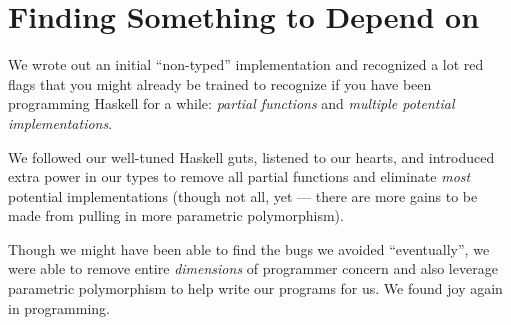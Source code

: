 \documentclass[]{article}
\newenvironment{Shaded}{}{}
\newcommand{\CommentTok}[1]{\textcolor[rgb]{0.38,0.63,0.69}{\textit{#1}}}
\newcommand{\ExtensionTok}[1]{#1}
\newcommand{\NormalTok}[1]{#1}
\begin{document}
\begin{Shaded}
\end{Shaded}

\hypertarget{finding-something-to-depend-on}{%
\section{Finding Something to Depend on}\label{finding-something-to-depend-on}}

We wrote out an initial ``non-typed'' implementation and recognized a lot red
flags that you might already be trained to recognize if you have been
programming Haskell for a while: \emph{partial functions} and \emph{multiple
potential implementations}.

We followed our well-tuned Haskell guts, listened to our hearts, and introduced
extra power in our types to remove all partial functions and eliminate
\emph{most} potential implementations (though not all, yet --- there are more
gains to be made from pulling in more parametric polymorphism).

Though we might have been able to find the bugs we avoided ``eventually'', we
were able to remove entire \emph{dimensions} of programmer concern and also
leverage parametric polymorphism to help write our programs for us. We found joy
again in programming.
\end{document}
